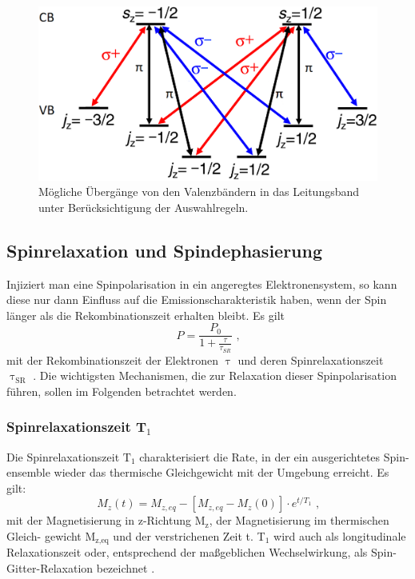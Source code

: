 \begin{figure}[h] \centering
\includegraphics[width=.5\textwidth]{Bilder/Vorbetrachtung/ausw}
\caption[Auswahlregeln]{Mögliche Übergänge von den Valenzbändern in das
Leitungsband unter Berücksichtigung der Auswahlregeln.} \label{Ausw}
\end{figure} \subsection{Spinrelaxation und Spindephasierung} Injiziert man eine
Spinpolarisation in ein angeregtes Elektronensystem, so kann diese nur dann
Einfluss auf die Emissionscharakteristik haben, wenn der Spin länger als die
Rekombinationszeit erhalten bleibt. Es gilt \begin{equation} P=\frac{P_0}{1+
\frac{\tau}{\tau_{SR}}} \text{ ,} \end{equation} mit der Rekombinationszeit der
Elektronen $\uptau$ und deren Spinrelaxationszeit $\uptau_\text{SR}$
\cite{Dyakonov.2008}. Die wichtigsten Mechanismen, die zur Relaxation dieser
Spinpolarisation führen, sollen im Folgenden betrachtet werden.
\subsubsection{Spinrelaxationszeit T$_\text{1}$} Die Spinrelaxationszeit
$\text{T}_\text{1}$ charakterisiert die Rate, in der ein ausgerichtetes Spin-
ensemble wieder das thermische Gleichgewicht mit der Umgebung erreicht. Es gilt:
\begin{equation} M_z(t)=M_{z,eq} -\left[ M_{z,eq}-M_z(0)\right]\cdot e^{t/T_1}
\text{ ,} \end{equation} mit der Magnetisierung in z-Richtung
$\text{M}_\text{z}$, der Magnetisierung im thermischen Gleich- gewicht
M$_\text{z,eq}$ und der verstrichenen Zeit t. T$_\text{1}$ wird auch als
longitudinale Relaxationszeit oder, entsprechend der maßgeblichen
Wechselwirkung, als Spin-Gitter-Relaxation bezeichnet \cite{Zutic.2004}.\\
